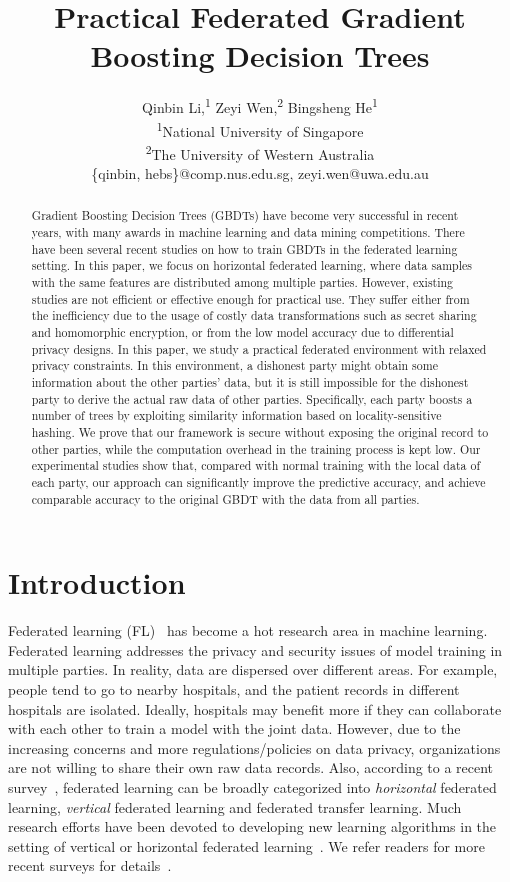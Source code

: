 \documentclass[letterpaper]{article} %
\title{Practical Federated Gradient Boosting Decision Trees}
\author{
Qinbin Li,\textsuperscript{\rm 1}
Zeyi Wen,\textsuperscript{\rm 2}
Bingsheng He\textsuperscript{\rm 1}\\
\textsuperscript{\rm 1}National University of Singapore\\
\textsuperscript{\rm 2}The University of Western Australia\\
\{qinbin, hebs\}@comp.nus.edu.sg, zeyi.wen@uwa.edu.au
}
\theoremstyle{definition}
\begin{document}
\maketitle

\begin{abstract}
Gradient Boosting Decision Trees (GBDTs) have become very successful in recent years, with many awards in machine learning and data mining competitions. There have been several recent studies on how to train GBDTs in the federated learning setting. In this paper, we focus on horizontal federated learning, where data samples with the same features are distributed among multiple parties. However, existing studies are not efficient or effective enough for practical use. They suffer either from the inefficiency due to the usage of costly data transformations such as secret sharing and homomorphic encryption, or from the low model accuracy due to differential privacy designs. In this paper, we study a practical federated environment with relaxed privacy constraints. In this environment, a dishonest party might obtain some information about the other parties' data, but it is still impossible for the dishonest party to derive the actual raw data of other parties. Specifically, each party boosts a number of trees by exploiting similarity information based on locality-sensitive hashing. We prove that our framework is secure without exposing the original record to other parties, while the computation overhead in the training process is kept low. Our experimental studies show that, compared with normal training with the local data of each party, our approach can significantly improve the predictive accuracy, and achieve comparable accuracy to the original GBDT with the data from all parties.
\end{abstract}


\section{Introduction}
Federated learning (FL)~\cite{McMahan2016FederatedLO,mirhoseini2016cryptoml,shi2017distributed,Yang:2019:FML:3306498.3298981,pmlr-v97-mohri19a,li2019federated} has become a hot research area in machine learning. Federated learning addresses the privacy and security issues of model training in multiple parties. In reality, data are dispersed over different areas. For example, people tend to go to nearby hospitals, and the patient records in different hospitals are isolated. Ideally, hospitals may benefit more if they can collaborate with each other to train a model with the joint data. However, due to the increasing concerns and more regulations/policies on data privacy, organizations are not willing to share their own raw data records. Also, according to a recent survey~\cite{Yang:2019:FML:3306498.3298981}, federated learning can be broadly categorized into \emph{horizontal} federated learning, \emph{vertical} federated learning and federated transfer learning. Much research efforts have been devoted to developing new learning algorithms in the setting of vertical or horizontal federated learning~\cite{smith2017federated,takabi2016privacy,liu2018secure,pmlr-v97-yurochkin19a}. We refer readers for more recent surveys for details~\cite{Yang:2019:FML:3306498.3298981,li2019federated}.
\end{document}
